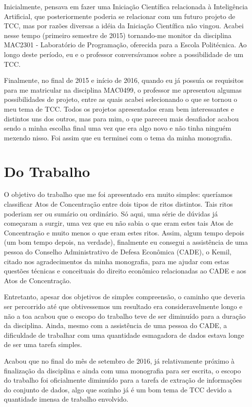 \documentclass[11pt]{report}
\begin{document}
Inicialmente, pensava em fazer uma Iniciação Científica relacionada à Inteligência Artificial, que posteriormente
poderia se relacionar com um futuro projeto de TCC, mas por razões diversas a idéia da Iniciação Científica não vingou.
Acabei nesse tempo (primeiro semestre de 2015) tornando-me monitor da disciplina MAC2301 - Laboratório de Programação, oferecida
para a Escola Politécnica. Ao longo deste período, eu e o professor conversávamos sobre a possibilidade de um TCC.

Finalmente, no final de 2015 e início de 2016, quando eu já possuía os requisitos para me matricular na disciplina MAC0499, o
professor me apresentou algumas possibilidades de projeto, entre as quais acabei selecionando o que se tornou o meu tema de TCC.
Todos os projetos apresentados eram bem interessantes e distintos uns dos outros, mas para mim, o que pareceu mais desafiador
acabou sendo a minha escolha final uma vez que era algo novo e não tinha ninguém mexendo nisso. Foi assim que eu terminei com o tema da
minha monografia.

\section*{Do Trabalho}

\indent\indent O objetivo do trabalho que me foi apresentado era muito simples: queríamos classificar Atos de Concentração entre dois
tipos de ritos distintos. Tais ritos poderiam ser ou sumário ou ordinário. Só aqui, uma série de dúvidas já começaram a surgir, uma
vez que eu não sabia o que eram estes tais Atos de Concentração e muito menos o que eram estes ritos. Assim, algum tempo depois (um bom tempo
depois, na verdade), finalmente eu consegui a assistência de uma pessoa do Conselho Administrativo de Defesa
Econômica (CADE), o Kemil, citado nos agradecimentos da minha monografia, para me ajudar com estas questões técnicas e conceituais do direito econômico relacionadas
ao CADE e aos Atos de Concentração.

Entretanto, apesar dos objetivos de simples compreensão, o caminho que deveria ser percorrido até que obtivessemos um resultado era consideravelmente longo e não a toa
acabou que o escopo do trabalho teve de ser diminuído para a duração da disciplina. Ainda, mesmo com a assistência de uma pessoa do CADE, a dificuldade
de trabalhar com uma quantidade esmagadora de dados estava longe de ser uma tarefa simples.

Acabou que no final do mês de setembro de 2016, já relativamente próximo à finalização da disciplina e ainda com uma monografia para ser escrita, o escopo
do trabalho foi oficialmente diminuído para a tarefa de extração de informações do conjunto de dados, algo que sozinho já é um bom tema de TCC devido a quantidade imensa
de trabalho envolvido.
\end{document}
